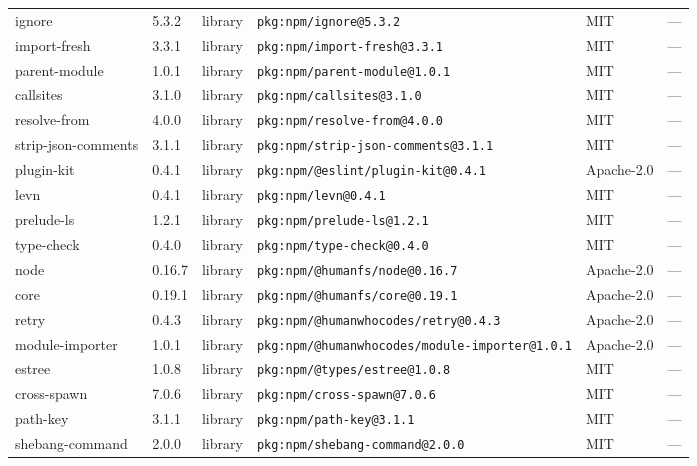 \documentclass[11pt,a4paper]{article}
\begin{document}
\begin{longtable}{|p{4cm}|p{2cm}|p{1.6cm}|p{5cm}|p{1.5cm}|p{3.5cm}|}
\raggedright ignore & 5.3.2 & library & \small\texttt{pkg:npm/ignore@5.3.2} & MIT & \small — \\
\raggedright import-fresh & 3.3.1 & library & \small\texttt{pkg:npm/import-fresh@3.3.1} & MIT & \small — \\
\raggedright parent-module & 1.0.1 & library & \small\texttt{pkg:npm/parent-module@1.0.1} & MIT & \small — \\
\raggedright callsites & 3.1.0 & library & \small\texttt{pkg:npm/callsites@3.1.0} & MIT & \small — \\
\raggedright resolve-from & 4.0.0 & library & \small\texttt{pkg:npm/resolve-from@4.0.0} & MIT & \small — \\
\raggedright strip-json-comments & 3.1.1 & library & \small\texttt{pkg:npm/strip-json-comments@3.1.1} & MIT & \small — \\
\raggedright plugin-kit & 0.4.1 & library & \small\texttt{pkg:npm/@eslint/plugin-kit@0.4.1} & Apache-2.0 & \small — \\
\raggedright levn & 0.4.1 & library & \small\texttt{pkg:npm/levn@0.4.1} & MIT & \small — \\
\raggedright prelude-ls & 1.2.1 & library & \small\texttt{pkg:npm/prelude-ls@1.2.1} & MIT & \small — \\
\raggedright type-check & 0.4.0 & library & \small\texttt{pkg:npm/type-check@0.4.0} & MIT & \small — \\
\raggedright node & 0.16.7 & library & \small\texttt{pkg:npm/@humanfs/node@0.16.7} & Apache-2.0 & \small — \\
\raggedright core & 0.19.1 & library & \small\texttt{pkg:npm/@humanfs/core@0.19.1} & Apache-2.0 & \small — \\
\raggedright retry & 0.4.3 & library & \small\texttt{pkg:npm/@humanwhocodes/retry@0.4.3} & Apache-2.0 & \small — \\
\raggedright module-importer & 1.0.1 & library & \small\texttt{pkg:npm/@humanwhocodes/module-importer@1.0.1} & Apache-2.0 & \small — \\
\raggedright estree & 1.0.8 & library & \small\texttt{pkg:npm/@types/estree@1.0.8} & MIT & \small — \\
\raggedright cross-spawn & 7.0.6 & library & \small\texttt{pkg:npm/cross-spawn@7.0.6} & MIT & \small — \\
\raggedright path-key & 3.1.1 & library & \small\texttt{pkg:npm/path-key@3.1.1} & MIT & \small — \\
\raggedright shebang-command & 2.0.0 & library & \small\texttt{pkg:npm/shebang-command@2.0.0} & MIT & \small — \\

\end{longtable}
\end{document}
